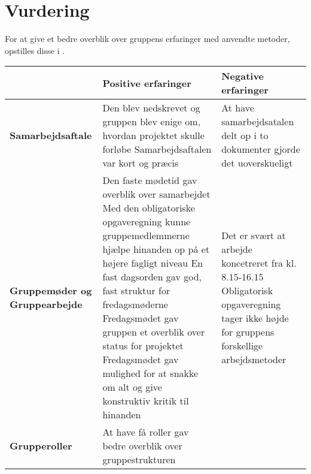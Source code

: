 \section{Vurdering}
For at give et bedre overblik over gruppens erfaringer med anvendte metoder, opstilles disse i .

\begin{table}[h]
	\label{Samvur}
	\begin{tabular}{|p{3.5cm}|p{5cm}|p{5cm}|}
		\hline
    	&\textbf{Positive erfaringer}                               &  \textbf{Negative erfaringer}                                                               \\ \hline
		\textbf{Samarbejdsaftale}             & 
		    	Den blev nedskrevet og gruppen blev enige om, hvordan projektet skulle forløbe                                                                        \newline 
		    	Samarbejdsaftalen var kort og præcis                &  At have samarbejdsatalen delt op i to dokumenter gjorde det uoverskueligt                   \\ \hline
		\textbf{Gruppemøder og Gruppearbejde} &  
		        Den faste mødetid gav overblik over samarbejdet                                                                                                       \newline
		     	Med den obligatoriske opgaveregning kunne gruppemedlemmerne hjælpe hinanden op på et højere fagligt niveau                                            \newline
		     	En fast dagsorden gav god, fast struktur for fredagsmøderne                                                                                           \newline
		        Fredagsmødet gav gruppen et overblik over status for projektet                                                                                        \newline
		        Fredagsmødet gav mulighed for at snakke om alt og give konstruktiv kritik til hinanden
		                                                           &   Det er svært at arbejde koncetreret fra kl. $8.15$-$16.15$                                     \newline
		                                                    	       Obligatorisk opgaveregning tager ikke højde for gruppens forskellige arbejdsmetoder         \\ \hline
		\textbf{Grupperoller}                         &
		       At have få roller gav bedre overblik over gruppestrukturen

\end{tabular}
\end{table}
